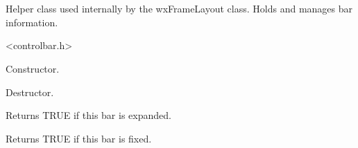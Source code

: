 %
%


\section{}\label{cbbarinfo}


Helper class used internally by the wxFrameLayout class.
Holds and manages bar information.




<controlbar.h>




\label{cbbarinfocbbarinfo}


Constructor.


\label{cbbarinfodtor}


Destructor.


\label{cbbarinfoisexpanded}


Returns TRUE if this bar is expanded.


\label{cbbarinfoisfixed}


Returns TRUE if this bar is fixed.

